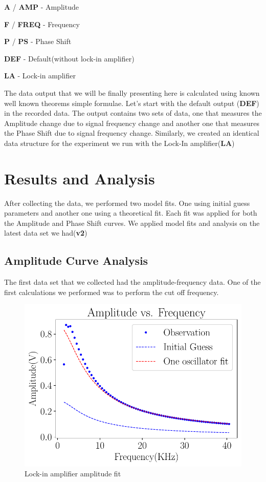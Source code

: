 \documentclass[twocolumn]{article}\usepackage[english]{babel}
\begin{document}
\begin{Steps}
 \item{\textbf{A} / \textbf{AMP} - Amplitude}
 \item{\textbf{F} / \textbf{FREQ} - Frequency }
 \item{\textbf{P} / \textbf{PS}  - Phase Shift}
 \item{\textbf{DEF} - Default(without lock-in amplifier)}
 \item{\textbf{LA} - Lock-in amplifier}
\end{Steps}
\newline \newline
The data output that we will be finally presenting here is calculated using known well known theorems simple formulae. Let's start with the default output (\textbf{DEF}) in the recorded data. The output contains two sets of data, one that measures the Amplitude change due to signal frequency change and another one that measures the Phase Shift due to signal frequency change. Similarly, we created an  identical data structure for the experiment we run with the Lock-In amplifier(\textbf{LA})   

\section{Results and Analysis}

After collecting the data, we performed two  model fits. One using initial guess parameters and another one using a theoretical fit. Each fit was applied for both the Amplitude and Phase Shift curves. We applied model fits and analysis on the latest data set we had(\textbf{v2})
\subsection{Amplitude Curve Analysis}
The first data set that we collected had the amplitude-frequency data. One of the first calculations we performed was to perform the cut off frequency.
\begin{figure}
\includegraphics[width=\linewidth]{images/v2/LA-Amplitude Fit.pdf}
\caption{Lock-in amplifier amplitude fit}
  \label{fig:LA Ampt fit}
\end{figure}
\end{document}
